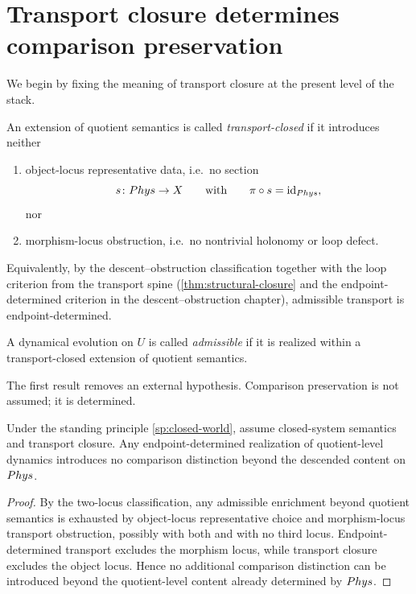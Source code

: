 \section{Transport closure determines comparison preservation}
We begin by fixing the meaning of transport closure at the present
level of the stack.
\begin{definition}
	An extension of quotient semantics is called
	\emph{transport-closed} if it introduces neither
	\begin{enumerate}[label=\textup{(\roman*)}]
		\item object-locus representative data, i.e.\ no section
		      \[
			      s\colon Phys\to X
			      \qquad\text{with}\qquad
			      \pi\circ s=\operatorname{id}_{Phys},
		      \]
		      nor
		\item morphism-locus obstruction, i.e.\ no nontrivial holonomy or loop
		      defect.
	\end{enumerate}
	Equivalently, by the descent--obstruction classification together with
	the loop criterion from the transport spine
	(\cref{thm:structural-closure} and the endpoint-determined criterion in
	the descent--obstruction chapter), admissible transport is
	endpoint-determined.
\end{definition}
\begin{definition}
	A dynamical evolution on \(U\) is called \emph{admissible} if it is
	realized within a transport-closed extension of quotient semantics.
\end{definition}
The first result removes an external hypothesis.  Comparison
preservation is not assumed; it is determined.
\begin{lemma}
	\label{lem:endpoint-no-new-comparison}
	Under the standing principle \cref{sp:closed-world}, assume
	closed-system semantics and transport closure.  Any
	endpoint-determined realization of quotient-level dynamics introduces
	no comparison distinction beyond the descended content on \(Phys\).
\end{lemma}
\begin{proof}
	By the two-locus classification, any admissible enrichment beyond
	quotient semantics is exhausted by object-locus representative choice
	and morphism-locus transport obstruction, possibly with both and with
	no third locus.
	Endpoint-determined transport excludes the morphism locus, while
	transport closure excludes the object locus.  Hence no additional
	comparison distinction can be introduced beyond the quotient-level
	content already determined by \(Phys\).
\end{proof}
